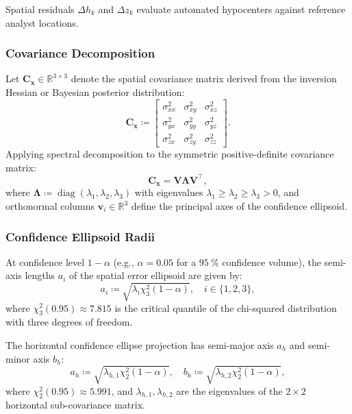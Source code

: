Spatial residuals $\Delta h_k$ and $\Delta z_k$ evaluate automated
hypocenters against
reference analyst locations.

\subsubsection*{Covariance Decomposition}
Let $\mathbf{C}_{\mathbf{x}} \in \mathbb{R}^{3 \times 3}$ denote the
spatial covariance
matrix derived from the inversion Hessian or Bayesian posterior distribution:
\begin{equation}
  \mathbf{C}_{\mathbf{x}} \coloneqq
  \begin{bmatrix}
    \sigma_{xx}^2 & \sigma_{xy}^2 & \sigma_{xz}^2 \\
    \sigma_{yx}^2 & \sigma_{yy}^2 & \sigma_{yz}^2 \\
    \sigma_{zx}^2 & \sigma_{zy}^2 & \sigma_{zz}^2
  \end{bmatrix}.
  \label{eq:supp_cov_matrix}
\end{equation}
Applying spectral decomposition to the symmetric positive-definite
covariance matrix:
\begin{equation}
  \mathbf{C}_{\mathbf{x}} = \mathbf{V} \boldsymbol{\Lambda} \mathbf{V}^\top,
  \label{eq:supp_cov_eigen}
\end{equation}
where $\boldsymbol{\Lambda} \coloneqq \operatorname{diag}(\lambda_1,
\lambda_2, \lambda_3)$
with eigenvalues $\lambda_1 \ge \lambda_2 \ge \lambda_3 > 0$, and
orthonormal columns
$\mathbf{v}_i \in \mathbb{R}^3$ define the principal axes of the
confidence ellipsoid.

\subsubsection*{Confidence Ellipsoid Radii}
At confidence level $1 - \alpha$ (e.g., $\alpha = \num{0.05}$ for a
$\qty{95}{\percent}$ confidence volume),
the semi-axis lengths $a_i$ of the spatial error ellipsoid are given by:
\begin{equation}
  a_i \coloneqq \sqrt{\lambda_i \chi^2_3(1 - \alpha)}, \quad i \in \{1, 2, 3\},
  \label{eq:supp_ellipsoid_radii}
\end{equation}
where $\chi^2_3(\num{0.95}) \approx \num{7.815}$ is the critical
quantile of the chi-squared distribution
with three degrees of freedom.

The horizontal confidence ellipse projection has semi-major axis
$a_h$ and semi-minor axis $b_h$:
\begin{equation}
  a_h \coloneqq \sqrt{\lambda_{h,1} \chi^2_2(1 - \alpha)}, \quad
  b_h \coloneqq \sqrt{\lambda_{h,2} \chi^2_2(1 - \alpha)},
  \label{eq:supp_horizontal_ellipse}
\end{equation}
where $\chi^2_2(\num{0.95}) \approx \num{5.991}$, and
$\lambda_{h,1}, \lambda_{h,2}$ are the eigenvalues
of the $2 \times 2$ horizontal sub-covariance matrix.

